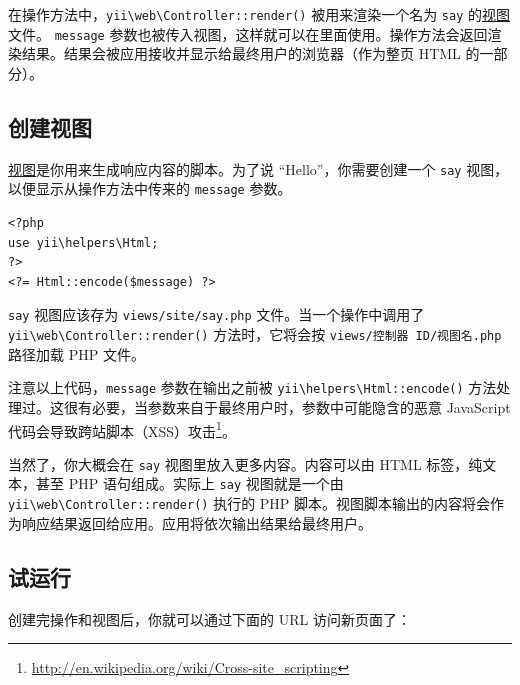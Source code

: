 在操作方法中，\texttt{yii{\allowbreak{}\textbackslash}web{\allowbreak{}\textbackslash}Controller\allowbreak{}::\allowbreak{}render()} 被用来渲染一个名为 \lstinline|say| 的\hyperref[structure-views.md]{视图}文件。 \lstinline|message| 参数也被传入视图，这样就可以在里面使用。操作方法会返回渲染结果。结果会被应用接收并显示给最终用户的浏览器（作为整页 HTML 的一部分）。

\subsection{创建视图 \label{start-hello.md::creating-view}}
\hyperref[structure-views.md]{视图}是你用来生成响应内容的脚本。为了说 “Hello”，你需要创建一个 \lstinline|say| 视图，以便显示从操作方法中传来的 \lstinline|message| 参数。

\lstset{language=php}\begin{lstlisting}
<?php
use yii\helpers\Html;
?>
<?= Html::encode($message) ?>
\end{lstlisting}
\lstinline|say| 视图应该存为 \lstinline|views/site/say.php| 文件。当一个操作中调用了 \texttt{yii{\allowbreak{}\textbackslash}web{\allowbreak{}\textbackslash}Controller\allowbreak{}::\allowbreak{}render()} 方法时，它将会按 \lstinline|views/控制器 ID/视图名.php| 路径加载 PHP 文件。

注意以上代码，\lstinline|message| 参数在输出之前被 \texttt{yii{\allowbreak{}\textbackslash}helpers{\allowbreak{}\textbackslash}Html\allowbreak{}::\allowbreak{}encode()} 方法处理过。这很有必要，当参数来自于最终用户时，参数中可能隐含的恶意 JavaScript 代码会导致跨站脚本（XSS）攻击\footnote{\url{http://en.wikipedia.org/wiki/Cross-site\_scripting}}。

当然了，你大概会在 \lstinline|say| 视图里放入更多内容。内容可以由 HTML 标签，纯文本，甚至 PHP 语句组成。实际上 \lstinline|say| 视图就是一个由 \texttt{yii{\allowbreak{}\textbackslash}web{\allowbreak{}\textbackslash}Controller\allowbreak{}::\allowbreak{}render()} 执行的 PHP 脚本。视图脚本输出的内容将会作为响应结果返回给应用。应用将依次输出结果给最终用户。

\subsection{试运行 \label{start-hello.md::trying-it-out}}
创建完操作和视图后，你就可以通过下面的 URL 访问新页面了：

